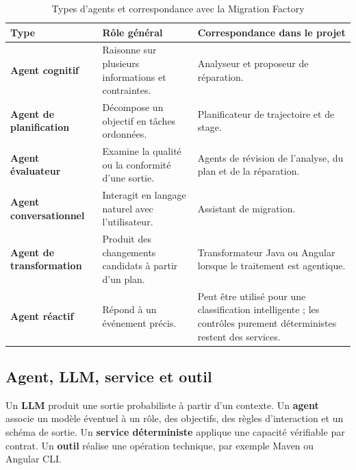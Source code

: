 \begin{table}[H]
    \centering
    \caption{Types d'agents et correspondance avec la Migration Factory}
    \label{tab:types-agents-ch2}
    \small
    \begin{tabularx}{\textwidth}{|>{\bfseries\RaggedRight\arraybackslash}p{3.5cm}|>{\RaggedRight\arraybackslash}X|>{\RaggedRight\arraybackslash}p{4.2cm}|}
        \hline
        \rowcolor{cgilight!95}
        \textbf{Type} & \textbf{Rôle général} & \textbf{Correspondance dans le projet} \\
        \hline
        Agent cognitif & Raisonne sur plusieurs informations et contraintes. & Analyseur et proposeur de réparation. \\
        \hline
        Agent de planification & Décompose un objectif en tâches ordonnées. & Planificateur de trajectoire et de stage. \\
        \hline
        Agent évaluateur & Examine la qualité ou la conformité d'une sortie. & Agents de révision de l'analyse, du plan et de la réparation. \\
        \hline
        Agent conversationnel & Interagit en langage naturel avec l'utilisateur. & Assistant de migration. \\
        \hline
        Agent de transformation & Produit des changements candidats à partir d'un plan. & Transformateur Java ou Angular lorsque le traitement est agentique. \\
        \hline
        Agent réactif & Répond à un événement précis. & Peut être utilisé pour une classification intelligente ; les contrôles purement déterministes restent des services. \\
        \hline
    \end{tabularx}
\end{table}

\subsection{Agent, LLM, service et outil}

Un \textbf{LLM} produit une sortie probabiliste à partir d'un contexte. Un \textbf{agent} associe un modèle éventuel à un rôle, des objectifs, des règles d'interaction et un schéma de sortie. Un \textbf{service déterministe} applique une capacité vérifiable par contrat. Un \textbf{outil} réalise une opération technique, par exemple Maven ou Angular CLI.

